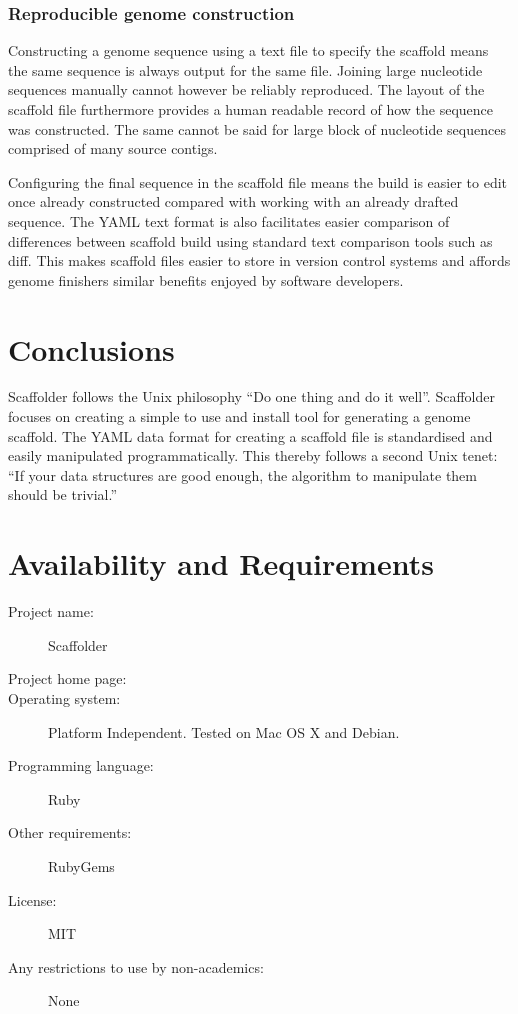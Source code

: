 \documentclass[10pt]{bmc_article}
\newenvironment{bmcformat}{\begin{raggedright}\baselineskip20pt\sloppy\setboolean{publ}{false}}{\end{raggedright}\baselineskip20pt\sloppy}
\begin{document}
\begin{bmcformat}
\subsubsection*{Reproducible genome construction} %

Constructing a genome sequence using a text file to specify the scaffold means
the same sequence is always output for the same file. Joining large nucleotide
sequences manually cannot however be reliably reproduced. The layout of the
scaffold file furthermore provides a human readable record of how the sequence
was constructed. The same cannot be said for large block of nucleotide
sequences comprised of many source contigs. \pb

Configuring the final sequence in the scaffold file means the build is easier
to edit once already constructed compared with working with an already drafted
sequence. The YAML text format is also facilitates easier comparison of
differences between scaffold build using standard text comparison tools such as
diff. This makes scaffold files easier to store in version control systems and
affords genome finishers similar benefits enjoyed by software developers. \pb 

\clearpage

\section*{Conclusions} %

Scaffolder follows the Unix philosophy ``Do one thing and do it well''.
Scaffolder focuses on creating a simple to use and install tool for generating
a genome scaffold. The YAML data format for creating a scaffold file is
standardised and easily manipulated programmatically. This thereby follows
a second Unix tenet: ``If your data structures are good enough, the algorithm
to manipulate them should be trivial.''

\clearpage

\section*{Availability and Requirements} %

  \begin{description}
    \item[Project name:] Scaffolder
    \item[Project home page:] \scaffolder
    \item[Operating system:] Platform Independent. Tested on Mac OS X and
    Debian.
    \item[Programming language:] Ruby
    \item[Other requirements:] RubyGems
    \item[License:] MIT
    \item[Any restrictions to use by non-academics:] None
  \end{description}


\end{bmcformat}
\end{document}
